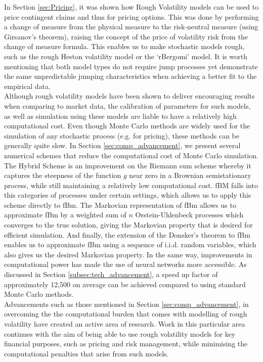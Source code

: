 \documentclass[12pt,oneside]{article}
\begin{document}
In Section \ref{sec:Pricing}, it was shown how Rough Volatility models can  be  used  to  price  contingent  claims  and  thus  for  pricing options. This was done by performing a change of measure from the physical measure to the risk-neutral measure (using Girsanov's theorem), raising the concept of the price of volatility risk from the change of measure formula. This enables us to make stochastic models rough, such as the rough Heston volatility model or the `rBergomi' model. It is worth mentioning that both model types do not require jump processes yet demonstrate the same unpredictable jumping characteristics when achieving a better fit to the empirical data.
\\

Although rough volatility models have been shown to deliver encouraging results when comparing to market data, the calibration of parameters for such models, as well as simulation using these models are liable to have a relatively high computational cost. Even though Monte Carlo methods are widely used for the simulation of any stochastic process (e.g. for pricing), these methods can be generally quite slow. In Section \ref{sec:comp_advancement}, we present several numerical schemes that reduce the computational cost of Monte Carlo simulation. The Hybrid Scheme is an improvement on the Riemann sum scheme whereby it captures the steepness of the function $g$ near zero in a Brownian semistationary process, while still maintaining a relatively low computational cost. fBM falls into this categories of processes under certain settings, which allows us to apply this scheme directly to fBm. The Markovian representation of fBm allows us to approximate fBm by a weighted sum of $n$ Orstein-Uhlenbeck processes which converges to the true solution, giving the Markovian property that is desired for efficient simulation. And finally, the extension of the Donsker's theorem to fBm enables us to approximate fBm using a sequence of i.i.d. random variables, which also gives us the desired Markovian property. In the same way, improvements in computational power has made the use of neural networks more accessible. As discussed in Section \ref{subsec:tech_advancement}, a speed up factor of approximately 12,500 on average can be achieved compared to using standard Monte Carlo methods.
\\

Advancements such as those mentioned in Section \ref{sec:comp_advancement}, in overcoming the the computational burden that comes with modelling of rough volatility have created an active area of research. Work in this particular area continues with the aim of being able to use rough volatility models for key financial purposes, such as pricing and risk management, while minimising the computational penalties that arise from such models. 


% 

\end{document}

